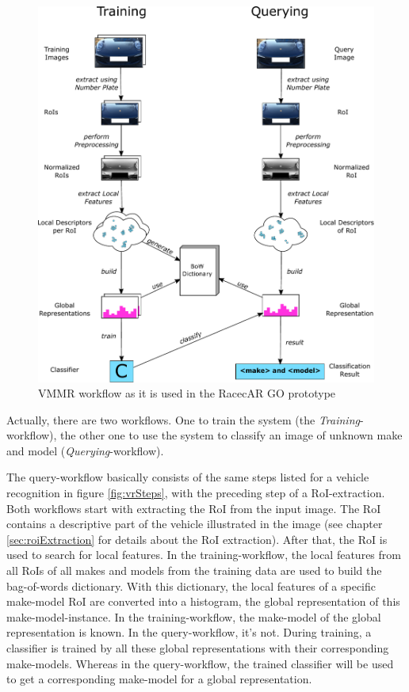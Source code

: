 \begin{figure}[btph]
  \centering
        \includegraphics[width=.95\linewidth]{gfx/vmmr_workflow}
        \caption{VMMR workflow as it is used in the RacecAR GO prototype}
        \label{fig:vmmrWorkflow}
\end{figure}

Actually, there are two workflows. One to train the system (the \emph{Training}-workflow), the other one to use the system to classify an image of unknown make and model (\emph{Querying}-workflow).

The query-workflow basically consists of the same steps listed for a vehicle recognition in figure \ref{fig:vrSteps}, with the preceding step of a RoI-extraction. Both workflows start with extracting the RoI from the input image. The RoI contains a descriptive part of the vehicle illustrated in the image (see chapter \ref{sec:roiExtraction} for details about the RoI extraction). After that, the RoI is used to search for local features. In the training-workflow, the local features from all RoIs of all makes and models from the training data are used to build the bag-of-words dictionary. With this dictionary, the local features of a specific make-model RoI are converted into a histogram, the global representation of this make-model-instance. In the training-workflow, the make-model of the global representation is known. In the query-workflow, it's not.
During training, a classifier is trained by all these global representations with their corresponding make-models. Whereas in the query-workflow, the trained classifier will be used to get a corresponding make-model for a global representation.

